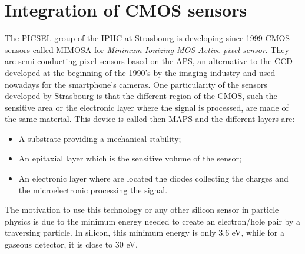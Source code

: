   \section{Integration of CMOS sensors}
  \label{sec:CMOS}


  The PICSEL group of the IPHC at Strasbourg is developing since 1999 CMOS sensors called MIMOSA for \textit{Minimum Ionizing MOS Active pixel sensor}. 
  They are semi-conducting pixel sensors based on the \gls{APS}, an alternative to the \gls{CCD} developed at the beginning of the 1990's by the imaging industry and used nowadays for the smartphone's cameras.
  One particularity of the sensors developed by Strasbourg is that the different region of the \gls{CMOS}, such the sensitive area or the electronic layer where the signal is processed, are made of the same material.
  This device is called then \acrfull{MAPS} and the different layers are:
  \begin{itemize}
    \item A substrate providing a mechanical stability;
    \item An epitaxial layer which is the sensitive volume of the sensor;
    \item An electronic layer where are located the diodes collecting the charges and the microelectronic processing the signal.
  \end{itemize}

  The motivation to use this technology or any other silicon sensor in particle physics is due to the minimum energy needed to create an electron/hole pair by a traversing particle.
  In silicon, this minimum energy is only 3.6 eV, while for a gaseous detector, it is close to 30 eV.


